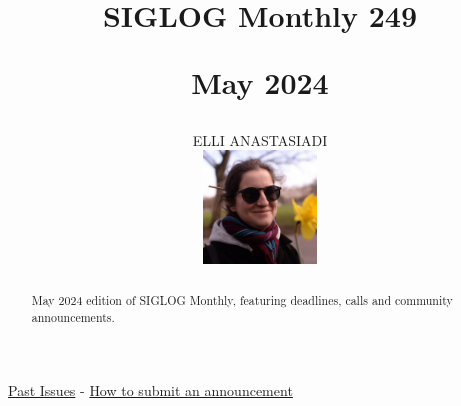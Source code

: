 \documentclass[prodmode,acmtecs]{acmsmall} %
\newcounter{colstart}
\begin{document}
\setcounter{colstart}{\thepage}

\title{{\huge\sc SIGLOG Monthly 249}

 May 2024}\author{ELLI ANASTASIADI\vspace*{-2.6cm}\begin{flushright}\includegraphics[width=30mm]{elli_anastasiadi.png}\end{flushright}}\begin{abstract}May 2024 edition of SIGLOG Monthly, featuring deadlines, calls and community announcements.
\end{abstract}


\maketitlee

\href{https://lics.siglog.org/newsletters/}{Past Issues}
 - 
\href{https://lics.siglog.org/newsletters/inst.html}{How to submit an announcement}
\end{document}
